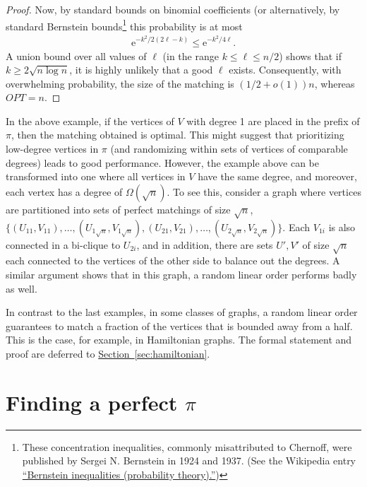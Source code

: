 \documentclass[11pt]{article}
\numberwithin{equation}{section}
\theoremstyle{definition}
\theoremstyle{plain}
\newcommand{\eee}{\mathrm e}
\newcommand{\expref}[2]{\hyperref[#2]{#1~\ref{#2}}}
\theoremstyle{plain}
\begin{document}
\begin{proof}
Now, by standard bounds on binomial coefficients (or alternatively, by standard
%
Bernstein bounds\footnote{These concentration inequalities, 
commonly misattributed to Chernoff, were published by 
Sergei N. Bernstein in 1924 and 1937. (See the Wikipedia
entry
\href{https://en.wikipedia.org/wiki/Bernstein_inequalities_(probability_theory)}{%
``Bernstein inequalities (probability theory).''})}
this probability is at most 
	\begin{eqnarray}
		\eee^{-k^2/2(2\ell-k)} \le \eee^{-k^2/4\ell}.
	\end{eqnarray}
	A union bound over all values of $\ell$ (in the range
%
$k \le \ell \le n/2$)   %
shows that if $k \ge 2\sqrt{n\log n}$, it is highly unlikely that a good $\ell$ exists. Consequently, with overwhelming probability, the size of the matching is $(1/2 +o(1))n$, whereas $OPT=n$.
\end{proof}



In the above example, if the vertices of $V$ with degree 1 are placed in the prefix of $\pi$, then the %
matching obtained  %
is optimal. This might suggest that prioritizing
%
low-degree   %
vertices in $\pi$ (and randomizing within sets of vertices of comparable degrees) leads to good performance.
However, the example above can be transformed into one where all vertices in $V$ have the same degree, and moreover, each vertex has a degree of $\Omega(\sqrt{n})$.
To see this, consider a graph where vertices are partitioned into sets of perfect matchings of size $\sqrt{n}$, $\{(U_{11},V_{11}),\ldots, (U_{1\sqrt{n}},V_{1\sqrt{n}}), (U_{21},V_{21}),\ldots, (U_{2\sqrt{n}},V_{2\sqrt{n}})\}$. Each $V_{1i}$ is also connected in a bi-clique to $U_{2i}$, and in addition, there are sets $U',V'$ of size $\sqrt{n}$ each connected to the vertices of the other side to balance out the degrees. A similar argument shows that in this graph, a random linear order performs badly as well. 

In contrast to the last examples, in some classes of graphs, a random linear order guarantees to match a fraction of the vertices that is bounded away from a half.
This is the case, for example, in Hamiltonian graphs.
The formal statement and proof are deferred to \expref{Section}{sec:hamiltonian}.


%
\section{Finding a perfect \texorpdfstring{$\pi$}{pi}}   %
%
\label{sec:perfect-pi}
\end{document}
